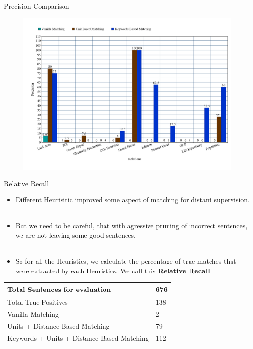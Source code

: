 \documentclass{beamer}
\begin{document}
\begin{frame}{Precision Comparison}
 
  \begin{figure}
    \centering
    \includegraphics[width = 1.0\textwidth]{images/results}
  \end{figure}
\end{frame}
\begin{frame}{Relative Recall}
\begin{itemize}
 \item Different Heurisitic improved some aspect of matching for distant supervision.  \\~\\
 \item But we need to be careful, that with agressive pruning of incorrect sentences, we are not leaving some good sentences. \\~\\
 \item So for all the Heuristics, we calculate the percentage of true matches that were extracted by each Heuristics. We call this \textbf{Relative Recall}
\end{itemize}
\begin{center}
\begin{tabular}{|l|l|}
 \hline
 Total Sentences for evaluation & 676 \\
 \hline
 Total True Positives & 138 \\
 \hline
 Vanilla Matching & 2 \\
 Units + Distance Based Matching & 79 \\
 Keywords + Units + Distance Based Matching & 112 \\
 \hline
 
\end{tabular}
\end{center}
\end{frame}
\end{document}

